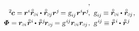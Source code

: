 \begin{equation*}
\begin{array}{r@{\hspace{.5em}}l}
\hspace{-0.3ex} ,
\\[.25em]
%
{{^2}\hspace{-0.2ex}\bm{c}} = \hspace{-0.1ex} \currentlocationvector^{i} \initiallocationvector_\differentialindex{i} \hspace{-0.1ex} \dotp \hspace{.1ex} \initiallocationvector_\differentialindex{\hspace{-0.1ex}j} \currentlocationvector^{j} \hspace{-0.25ex}
= \textsl{g}_{i\hspace{-0.1ex}j} \hspace{.1ex} \currentlocationvector^{i} \hspace{-0.2ex} \currentlocationvector^{j}
\hspace{-0.3ex} , &
\textsl{g}_{i\hspace{-0.1ex}j} \hspace{-0.15ex} \equiv
\initiallocationvector_\differentialindex{i} \hspace{-0.1ex} \dotp \hspace{.1ex} \initiallocationvector_\differentialindex{\hspace{-0.1ex}j}
\hspace{.1ex} ,
\\[.25em]
%
\mathboldPhi = \hspace{-0.1ex} \currentlocationvector_\differentialindex{i} \hspace{.1ex} \initiallocationvector^i \hspace{-0.15ex} \dotp \hspace{.1ex} \initiallocationvector^j \hspace{-0.25ex} \currentlocationvector_\differentialindex{\hspace{-0.1ex}j} \hspace{-0.2ex}
= \textsl{g}^{\hspace{.2ex}i\hspace{-0.1ex}j} \currentlocationvector_\differentialindex{i} \currentlocationvector_\differentialindex{\hspace{-0.1ex}j}
\hspace{.1ex} , &
\textsl{g}^{\hspace{.2ex}i\hspace{-0.1ex}j} \hspace{-0.15ex} \equiv
\initiallocationvector^{\hspace{.1ex}i} \hspace{-0.15ex} \dotp \hspace{.1ex} \initiallocationvector^{\hspace{.1ex}j}
\end{array}
\end{equation*}

